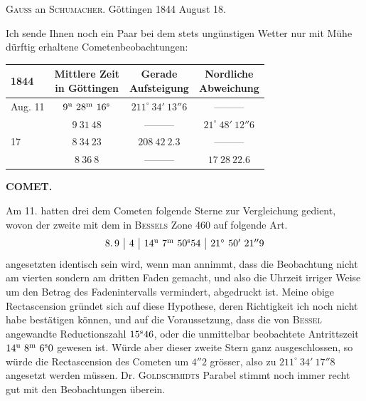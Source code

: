 \par{}\bigskip
\hypertarget{native-472-lower}{}
\begin{center}\textsc{Gauss} an \textsc{Schumacher}. Göttingen 1844 August 18.\end{center}

Ich sende Ihnen noch ein Paar bei dem stets ungünstigen Wetter nur mit Mühe dürftig erhaltene Cometenbeobachtungen:

\begin{center}
\setlength{\tabcolsep}{4pt}
\begin{tabular}{l|c|c|c}
1844 & \shortstack{Mittlere Zeit\\in Göttingen} & \shortstack{Gerade\\Aufsteigung} & \shortstack{Nordliche\\Abweichung} \\\hline
Aug. 11 & $9^{\rm u}\ 28^{\rm m}\ 16^{\rm s}$ & $211^\circ\ 34'\ 13''6$ & ---\quad ---\quad --- \\
 & $9\ 31\ 48$ & ---\quad ---\quad --- & $21^\circ\ 48'\ 12''6$ \\
17 & $8\ 34\ 23$ & $208\ 42\ 2.3$ & ---\quad ---\quad --- \\
 & $8\ 36\ 8$ & ---\quad ---\quad --- & $17\ 28\ 22.6$ \\
\end{tabular}
\end{center}

\clearpage
\noindent{}%
%
\parbox[t]{\dimexpr\linewidth-24mm\relax}{\centering\footnotesize\bfseries COMET.\par}%
\makebox[12mm][r]{}\par\nobreak\medskip
Am 11. hatten drei dem Cometen folgende Sterne zur Vergleichung gedient, wovon der zweite mit dem in \textsc{Bessels} Zone 460 auf folgende Art.
\[
\begin{array}{c|c|c|c}
8.\,9 & 4 & 14^{\rm u}\ 7^{\rm m}\ 50^{\rm s}54 & 21^\circ\ 50'\ 21''9
\end{array}
\]
\noindent angesetzten identisch sein wird, wenn man annimmt, dass die Beobachtung nicht am vierten sondern am dritten Faden gemacht, und also die Uhrzeit irriger Weise um den Betrag des Fadenintervalls vermindert, abgedruckt ist. Meine obige Rectascension gründet sich auf diese Hypothese, deren Richtigkeit ich noch nicht habe bestätigen können, und auf die Voraussetzung, dass die von \textsc{Bessel} angewandte Reductionszahl $15^{\rm s}46$, oder die unmittelbar beobachtete Antrittszeit $14^{\rm u}\ 8^{\rm m}\ 6^{\rm s}0$ gewesen ist. Würde aber dieser zweite Stern ganz ausgeschlossen, so würde die Rectascension des Cometen um $4''2$ grösser, also zu $211^\circ\ 34'\ 17''8$ angesetzt werden müssen. Dr. \textsc{Goldschmidts} Parabel stimmt noch immer recht gut mit den Beobachtungen überein.

